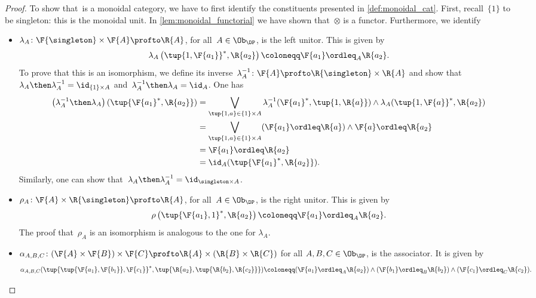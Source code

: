 \begin{proof}
  To show that~\DP is a monoidal category, we have to first identify the constituents presented in \cref{def:monoidal_cat}. First, recall~$\{1\}$ to be singleton: this is the monoidal unit. In \cref{lem:monoidal_functorial} we have shown that~$\otimes$ is a functor. Furthermore, we identify
  \begin{itemize}
    \item $\lambda_A \colon \F{\singleton} \times \F{A} \profto \R{A}$, for all~$A\in \Ob_\DP$, is the left unitor. This is given by
    \begin{equation}
      \lambda_A\left( \tup{1,\F{a_1}}^*,\R{a_2}\right)\coloneqq \F{a_1}\ordleq_A \R{a_2}.
    \end{equation}
    To prove that this is an isomorphism, we define its inverse~$\lambda_A^{-1}\colon \F{A}\profto \R{\singleton} \times \R{A}$ and show that~$\lambda_A\then \lambda_A^{-1}=\id_{\{1\}\times A}$ and~$\lambda_A^{-1}\then \lambda_A=\id_{A}$. One has
    \begin{equation}
      \begin{aligned}
        \left( \lambda_A^{-1}\then \lambda_A\right)(\tup{\F{a_1}^*,\R{a_2}})&= \bigvee_{\tup{1,a}\in  \{1\}\times A} \lambda_A^{-1}(\F{a_1}^*,\tup{1,\R{a}})\wedge \lambda_A(\tup{1,\F{a}}^*,\R{a_2})\\
        &= \bigvee_{\tup{1,a}\in  \{1\}\times A}(\F{a_1}\ordleq \R{a}) \wedge \F{a}\ordleq \R{a_2}\\
        &=\F{a_1}\ordleq \R{a_2}\\
        &=\id_A(\tup{\F{a_1}^*,\R{a_2}}).
      \end{aligned}
    \end{equation}
    Similarly, one can show that~$\lambda_A\then \lambda_A^{-1}=\id_{\singleton \times A}$.
    \item $\rho_A\colon \F{A} \times \R{\singleton} \profto \R{A}$, for all~$A\in \Ob_\DP$, is the right unitor. This is given by
    \begin{equation}
      \rho\left( \tup{\F{a_1},1}^*,\R{a_2}\right)\coloneqq \F{a_1}\ordleq_A \R{a_2}.
    \end{equation}
    The proof that~$\rho_A$ is an isomorphism is analogous to the one for $\lambda_A$.
    \item $\alpha_{A,B,C}\colon (\F{A}\times \F{B})\times \F{C} \profto \R{A} \times (\R{B}\times \R{C})$ for all $A,B,C \in \Ob_\DP$, is the associator. It is given by
    \begin{equation}
      \alpha_{A,B,C}(\tup{\tup{\F{a_1},\F{b_1}},\F{c_1}}^*,\tup{\R{a_2},\tup{\R{b_2},\R{c_2}}})\coloneqq (\F{a_1}\ordleq_A \R{a_2}) \wedge (\F{b_1} \ordleq_B \R{b_2})\wedge (\F{c_1}\ordleq_C \R{c_2}).

\end{equation}
\end{itemize}
\end{proof}
